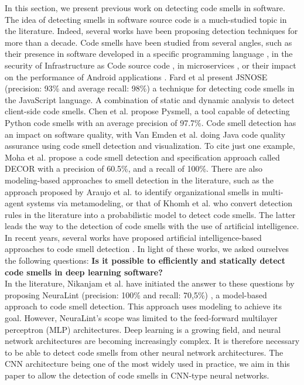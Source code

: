 \label{sec:background}
In this section, we present previous work on detecting code smells in software.\\

The idea of detecting smells in software source code is a much-studied topic in
the literature. Indeed, several works have been proposing detection techniques
for more than a decade. Code smells have been studied from several angles, such
as their presence in software developed in a specific programming language
\cite{saboury2017empirical}, in the security of Infrastructure as Code source
code \cite{rahman2021security}, in microservices \cite{cernymicroservice}, or
their impact on the performance of Android applications
\cite{hecht2016empirical}. Fard et al \cite{6648192} present JSNOSE (precision:
93\% and average recall: 98\%) a technique for detecting code smells in the
JavaScript language. A combination of static and dynamic analysis to detect
client-side code smells. Chen et al. \cite{chen2016detecting} propose Pysmell, a
tool capable of detecting Python code smells with an average precision of 97.7\%.
Code smell detection has an impact on software quality, with Van Emden et al.
\cite{1173068} doing Java code quality assurance using code smell detection and
visualization. To cite just one example, Moha et al. \cite{moha2010decor}
propose a code smell detection and specification approach called DECOR with a
precision of 60.5\%, and a recall of 100\%. There are also modeling-based
approaches to smell detection in the literature, such as the approach proposed
by Araujo et al. \cite{araujo2018metamodeling} to identify organizational smells
in multi-agent systems via metamodeling, or that of Khomh et al.
\cite{khomh2009bayesian} who convert detection rules in the literature into a
probabilistic model to detect code smells. The latter leads the way to the
detection of code smells with the use of artificial intelligence. In recent
years, several works have proposed artificial intelligence-based approaches to
code smell detection \cite{alawadi2023fedcsd, sandouka2023python, alazba2023deep}. In
light of these works, we asked ourselves the following questions: \textbf{Is it
    possible to efficiently and statically detect code smells in deep learning
    software?} \\In the literature, Nikanjam et al. have initiated the answer to
these questions by proposing NeuraLint (precision: 100\% and recall: 70,5\%)
\cite{nikanjam2021automatic}, a model-based approach to code smell detection.
This approach uses modeling to achieve its goal. However, NeuraLint's scope was
limited to the feed-forward multilayer perceptron (MLP) architectures. Deep
learning is a growing field, and neural network architectures are becoming
increasingly complex. It is therefore necessary to be able to detect code smells
from other neural network architectures. The CNN architecture being one of the
most widely used in practice, we aim in this paper to allow the detection of
code smells in CNN-type neural networks.










